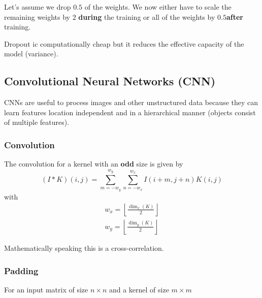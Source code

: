 Let's assume we drop $0.5$ of the weights. We now either have to scale the remaining weights by $2$ \textbf{during} the training or all of the weights by $0.5$\textbf{after} training.

\newpar{}
Dropout ic computationally cheap but it reduces the effective capacity of the model (variance).

\subsection{Convolutional Neural Networks (CNN)}

CNNs are useful to process images and other unstructured data because they can learn features location independent and in a hierarchical manner (objects consist of multiple features).
\newpar{}


\subsubsection{Convolution}
The convolution for a kernel with an \textbf{odd} size is given by
\begin{equation*}
    (I * K)(i,j) = \sum_{m=-w_y}^{w_y}\sum_{n=-w_x}^{w_x}I(i+m,j+n)K(i,j)
\end{equation*}
with
\begin{gather*}
    w_x = \left\lfloor \frac{\dim_x(K)}{2} \right\rfloor \\
    w_y = \left\lfloor \frac{\dim_y(K)}{2} \right\rfloor
\end{gather*}

Mathematically speaking this is a cross-correlation.

\subsubsection{Padding}

For an input matrix of size $n\times n$ and a kernel of size $m\times m$

\newpar{}

